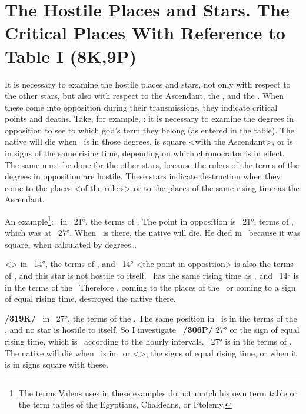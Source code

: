 \section{The Hostile Places and Stars. The Critical Places With Reference to Table I (8K,9P)}

 
It is necessary to examine the hostile places and stars, not only with respect to the other stars, but also with respect to the Ascendant, the \Sun, and the \Moon. When these come into opposition during their
transmissions, they indicate critical points and deaths. Take, for example, \Saturn: it is necessary to examine the degrees in opposition to see to which god’s term they belong (as entered in the table). The
native will die when \Saturn\, is in those degrees, is square <with the Ascendant>, or is in signs of the same rising time, depending on which chronocrator is in effect.  The same must be done for the other stars, because the rulers of the terms of the degrees in opposition are hostile. These stars indicate destruction when they come to the places <of the rulers> or to the places of the same rising time as the Ascendant.

An example\footnote{The terms Valens uses in these examples do not match his own term table or the term tables of the Egyptians, Chaldeans, or Ptolemy.}: \Saturn\, in \Cancer\, 21°, the terms of \Venus. The point in opposition is \Capricorn\, 21°, terms of \Mars, which was at \Taurus\, 27°. When \Saturn\, is there, the native will die. He died in \Virgo\, because it was square, when calculated by degrees…

<\Jupiter> in \Scorpio\, 14°, the terms of \Saturn, and \Taurus\, 14° <the point in opposition> is also the terms of \Saturn, and this star is not hostile to itself. \Leo\, has the same rising time as \Scorpio, and \Leo\, 14° is in the terms of the \Sun\, Therefore \Jupiter, coming to the places of the \Sun\, or coming to a sign of equal rising time, destroyed the native there.

\textbf{/319K/} \Mars\, in \Taurus\, 27°, the terms of the \Sun. The same position in \Scorpio\, is in the terms of the
\Sun, and \mndl no star is hostile to itself. So I investigate \Leo\, \textbf{/306P/} 27° or the sign of equal rising time, which is \Gemini\, according to the hourly intervals. \Gemini\, 27° is in the terms of \Venus. The native will die when \Mars\, is in \Scorpio\, or <\Aquarius>, the signs of equal rising time, or when it is in signs square with these. 

